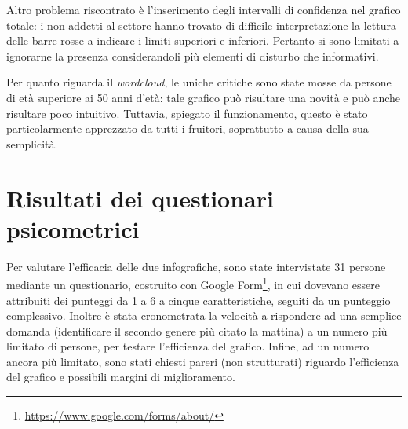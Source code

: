 \documentclass[12pt, a4paper, twocolumn]{article} %
\begin{document}
Altro problema riscontrato è l'inserimento degli intervalli di confidenza nel grafico totale: i non addetti al settore hanno trovato di difficile interpretazione la lettura delle barre rosse a indicare i limiti superiori e inferiori.
Pertanto si sono limitati a ignorarne la presenza considerandoli più elementi di disturbo che informativi.

Per quanto riguarda il \textit{wordcloud}, le uniche critiche sono state mosse da persone di età superiore ai 50 anni d'età: tale grafico può risultare una novità e può anche risultare poco intuitivo.
Tuttavia, spiegato il funzionamento, questo è stato particolarmente apprezzato da tutti i fruitori, soprattutto a causa della sua semplicità.

\section{Risultati dei questionari psicometrici}
Per valutare l'efficacia delle due infografiche, sono state intervistate 31 persone mediante un questionario, costruito con Google Form\footnote{\url{https://www.google.com/forms/about/}}, in cui dovevano essere attribuiti dei punteggi da 1 a 6 a cinque caratteristiche, seguiti da un punteggio complessivo.
Inoltre è stata cronometrata la velocità a rispondere ad una semplice domanda (identificare il secondo genere più citato la mattina) a un numero più limitato di persone, per testare l'efficienza del grafico.
Infine, ad un numero ancora più limitato, sono stati chiesti pareri (non strutturati) riguardo l'efficienza del grafico e possibili margini di miglioramento.
\end{document}
